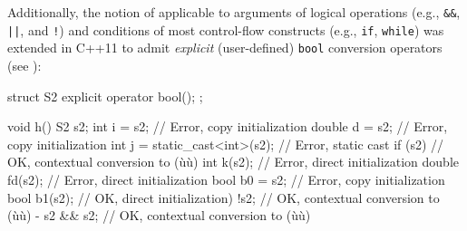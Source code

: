 \noindent Additionally, the notion of  
applicable to arguments of logical operations
(e.g., \lstinline!&&!, \lstinline!||!, and \lstinline|!|) and conditions of
most control-flow constructs (e.g., \lstinline!if!, \lstinline!while!) was
extended in C++11 to admit \emph{explicit} (user-defined) \lstinline!bool!
conversion operators (see ):

\begin{emcppslisting}
struct S2 { explicit operator bool(); };

void h()
{
    S2 s2;
    int i = s2;                    // Error, copy initialization
    double d = s2;                 // Error, copy initialization
    int j = static_cast<int>(s2);  // Error, static cast
    if (s2) { }                    // OK, contextual conversion to (ù{}ù)
    int k(s2);                     // Error, direct initialization
    double fd(s2);                 // Error, direct initialization
    bool b0 = s2;                  // Error, copy initialization
    bool b1(s2);                   // OK, direct initialization)                                     
    !s2;                           // OK, contextual conversion to (ù{}ù)                                               -
    s2 && s2;                      // OK, contextual conversion to (ù{}ù)
}
\end{emcppslisting}
    
